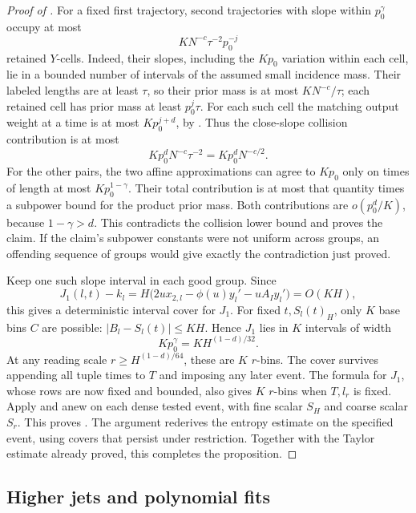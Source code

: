 \begin{proof}[Proof of ]
For a fixed first trajectory, second trajectories with slope within
\(p_0^\gamma\) occupy at most
\[
 K N^{-c}\tau^{-2}p_0^{-j}
\]
retained \(Y\)-cells.
Indeed, their slopes, including the \(Kp_0\) variation within each cell,
lie in a bounded number of intervals of the assumed small incidence
mass.  Their labeled lengths are at least \(\tau\), so their prior
mass is at most \(KN^{-c}/\tau\); each retained cell has prior mass
at least \(p_0^j\tau\).
For each such cell the matching output weight at a time is at most
\(Kp_0^{j+d}\), by .
Thus the close-slope collision contribution is at most
\[
 Kp_0^d N^{-c}\tau^{-2}=Kp_0^dN^{-c/2}.
\]
For the other pairs, the two affine approximations can agree to
\(Kp_0\) only on times of length at most \(Kp_0^{1-\gamma}\).
Their total contribution is at most that quantity times a subpower
bound for the product prior mass.
Both contributions are \(o(p_0^d/K)\), because \(1-\gamma>d\).
This contradicts the collision lower bound and proves the claim.
If the claim's subpower constants were not uniform across groups,
an offending sequence of groups would give exactly the contradiction
just proved.

Keep one such slope interval in each good group.
Since
\begin{equation}\label{a04:quadratic-jet-error}
 J_1(l,t)-k_l
   =H\bigl(2u x_{2,l}-\phi(u)y_l'-uA_Iy_l'\bigr)=O(KH),
\end{equation}
this gives a deterministic interval cover for \(J_1\).
For fixed \(t,S_l(t)_H\), only \(K\) base bins \(C\) are possible:
\(|B_l-S_l(t)|\le KH\).
Hence \(J_1\) lies in \(K\) intervals of width
\[
 Kp_0^\gamma=KH^{(1-d)/32}.
\]
At any reading scale \(r\ge H^{(1-d)/64}\), these are \(K\) \(r\)-bins.
The cover survives appending all tuple times to \(T\) and imposing
any later event.  The formula for \(J_1\), whose rows are now fixed
and bounded, also gives \(K\) \(r\)-bins when \(T,l_r\) is fixed.
Apply  and
 anew on each dense tested event,
with fine scalar \(S_H\) and coarse scalar \(S_r\).
This proves .
The argument rederives the entropy estimate on the specified event,
using covers that persist under restriction.  Together with the Taylor
estimate already proved, this completes the proposition.
\end{proof}


\subsection{Higher jets and polynomial fits}

